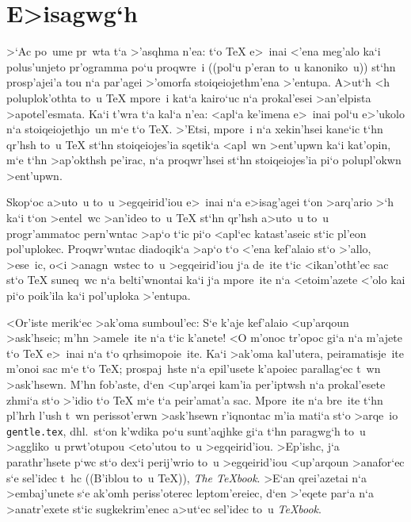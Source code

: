 \section{E>isagwg`h}

\tengr

>`Ac po~ume pr~wta t`a >'asqhma n'ea: t`o {\rm \TeX} e>~inai <'ena
meg'alo ka`i polus'unjeto pr'ogram\-ma po`u proqwre~i ((pol`u p'eran
to~u kanoniko~u)) st`hn prosp'ajei'a tou n`a par'agei >'omorfa
stoiqeio\-je\-thm'ena >'entupa.  A>ut`h <h po\-lu\-plo\-k'o\-th\-ta to~u
{\rm \TeX} mpore~i kat`a kai\-ro`uc n`a prokal'esei >an'elpista
>apotel'esmata.  Ka`i t'wra t`a kal`a n'ea:  <apl`a ke'imena e>~inai
pol`u e>'ukolo n`a stoi\-qei\-o\-jethjo~un m`e t`o {\rm \TeX}\null.
>'Etsi, mpore~i n`a xekin'hsei kane`ic t`hn qr'hsh to~u {\rm \TeX} st`hn
stoi\-qei\-ojes'ia sqetik`a <apl~wn >ent'upwn ka`i kat'opin, m`e t`hn
>ap'okthsh pe'irac, n`a proqwr'hsei st`hn stoiqeiojes'ia pi`o
polupl'okwn >ent'upwn.

Skop`oc a>uto~u to~u >egqeirid'iou e>~inai n`a e>isag'agei t`on         
>arq'ario >`h ka`i t`on >entel~wc >an'ideo to~u {\rm \TeX} st`hn qr'hsh 
a>uto~u to~u progr'ammatoc pern'wntac >ap`o t`ic pi`o <apl`ec
katast'aseic st`ic pl'eon pol'uplokec.  Proqwr'wntac diadoqik`a >ap`o
t`o <'ena kef'alaio st`o >'allo, >ese~ic, o<i >ana\-gn~wstec to~u
>egqeirid'iou j`a de~ite t`ic <ikan'otht'ec sac st`o {\rm \TeX} suneq~wc
n`a belti'wnontai ka`i j`a mpore~ite n`a <etoim'azete <'olo kai pi`o
poik'ila ka`i pol'uploka >'entupa.

<Or'iste merik`ec >ak'oma sumboul'ec: S`e k'aje kef'alaio <up'arqoun
>ask'hseic;  m'hn >amele~ite n`a t`ic k'anete!  <O m'onoc tr'opoc gi`a 
n`a m'ajete t`o {\rm \TeX} e>~inai n`a t`o qrhsimopoie~ite.  Ka`i >ak'oma
kal'utera, peiramatisje~ite m'onoi sac m`e t`o {\rm \TeX}; prospaj~hste
n`a epil'usete k'apoiec parallag`ec t~wn >ask'hsewn.  M'hn fob'aste,
d`en <up'arqei kam'ia per'iptwsh n`a prokal'esete zhmi`a st`o >'idio
t`o {\rm \TeX} m`e t`a peir'amat'a sac.   Mpore~ite n`a bre~ite t`hn
pl'hrh l'ush t~wn perissot'erwn >ask'hsewn r'iqnontac m'ia              
mati`a st`o >arqe~io {\tt gentle.tex}, dhl.\ st`on k'wdika po`u
sunt'aqjhke gi`a t`hn paragwg`h to~u >aggliko~u prwt'otupou <eto'utou
to~u >egqeirid'iou.  >Ep'ishc, j`a parathr'hsete p`wc st`o dex`i
perij'wrio to~u >egqeirid'iou <up'arqoun >anafor`ec s`e sel'idec t~hc
((B'iblou to~u {\rm \TeX})), {\sl The \TeX book}. >E`an
qrei'azetai n`a >embaj'unete s`e ak'omh periss'oterec leptom'ereiec, d`en
>'eqete par`a n`a >anatr'exete st`ic sugkekrim'enec a>ut`ec sel'idec
to~u {\sl \TeX book}\null.

